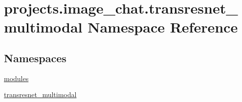 \hypertarget{namespaceprojects_1_1image__chat_1_1transresnet__multimodal}{}\section{projects.\+image\+\_\+chat.\+transresnet\+\_\+multimodal Namespace Reference}
\label{namespaceprojects_1_1image__chat_1_1transresnet__multimodal}
\subsection*{Namespaces}
\begin{DoxyCompactItemize}
\item 
 \hyperlink{namespaceprojects_1_1image__chat_1_1transresnet__multimodal_1_1modules}{modules}
\item 
 \hyperlink{namespaceprojects_1_1image__chat_1_1transresnet__multimodal_1_1transresnet__multimodal}{transresnet\+\_\+multimodal}
\end{DoxyCompactItemize}
